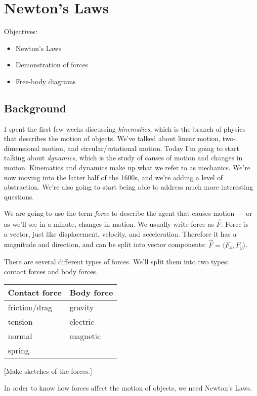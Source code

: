 \section{Newton's Laws}
Objectives:
\begin{itemize}
\item Newton's Laws
\item Demonstration of forces
\item Free-body diagrams
\end{itemize}

\subsection{Background}
I spent the first few weeks discussing \textit{kinematics}, which is the branch of physics that describes the motion of objects. We've talked about linear motion, two-dimensional motion, and circular/rotational motion. Today I'm going to start talking about \textit{dynamics}, which is the study of causes of motion and changes in motion. Kinematics and dynamics make up what we refer to as mechanics. We're now moving into the latter half of the 1600s, and we're adding a level of abstraction. We're also going to start being able to address much more interesting questions.

We are going to use the term \textit{force} to describe the agent that causes motion --- or as we'll see in a minute, changes in motion. We usually write force as $\vec{F}$. Force is a vector, just like displacement, velocity, and acceleration. Therefore it has a magnitude and direction, and can be split into vector components: $\vec{F}=\langle{F_x,F_y}\rangle$.

There are several different types of forces. We'll split them into two types: contact forces and body forces.

\begin{table}[h]
\begin{tabular}{ll}
Contact force & Body force\\
\hline
friction/drag & gravity\\
tension & electric\\
normal & magnetic\\
spring & \\
\hline
\end{tabular}
\end{table}

[Make sketches of the forces.]
\clearpage

In order to know how forces affect the motion of objects, we need Newton's Laws.

